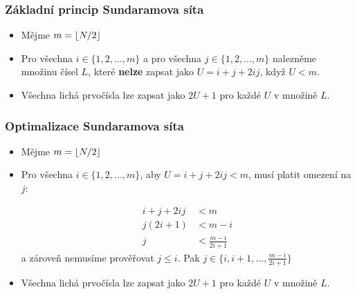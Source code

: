 \documentclass{beamer}
\DeclarePairedDelimiter\floor{\lfloor}{\rfloor}
\begin{document}
\begin{frame}
  \frametitle{Základní princip Sundaramova síta}

\begin{itemize}

\item Mějme $m = \floor{N/2}$
\item Pro všechna $i \in \{1, 2,..., m\}$ a pro všechna $j \in \{1, 2,..., m\}$ nalezněme množinu čísel $L$, které \textbf{nelze} zapsat jako $U = i+j+2ij$, když $U<m$.

\item Všechna lichá prvočísla lze zapsat jako $2U + 1$ pro každé $U$ v množině $L$.
\end{itemize}

\end{frame}




\begin{frame}
  \frametitle{Optimalizace Sundaramova síta}

\begin{itemize}

\item Mějme $m = \floor{N/2}$
\item Pro všechna $i \in \{1, 2,..., m\}$, aby $U = i+j+2ij < m$, musí platit omezení na $j$:

\begin{align*}
i+j+2ij &< m\\
j(2i+1) &< m-i\\
j &< \frac{m-i}{2i+1}
\end{align*}  
a zároveň nemusíme prověřovat $j \leq i$. Pak $j \in \{i, i+1,..., \frac{m-i}{2i+1}\}$

\item Všechna lichá prvočísla lze zapsat jako $2U + 1$ pro každé $U$ v množině $L$.
\end{itemize}

\end{frame}
\end{document}
